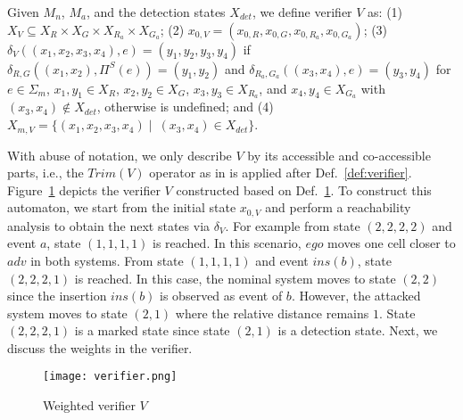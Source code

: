 \begin{definition}\label{def:verifier}
Given $M_n$, $M_a$, and the detection states $X_{det}$, we define verifier $V$ as: 
(1) $X_{V}\subseteq X_{R}\times X_G \times X_{R_a}\times X_{G_a}$; (2) $x_{0,V} = (x_{0,R},x_{0,G},x_{0,R_a},x_{0,G_a})$; (3) $\delta_{V}((x_1,x_2,x_3,x_4),e) = (y_1,y_2,y_3,y_4)$ if $\delta_{R,G}((x_1,x_2),\Pi^S(e)) = (y_1,y_2)$ and $\delta_{R_a,G_a}((x_3,x_4),e) = (y_3,y_4)$  for $e\in \Sigma_m$, $x_1,y_1\in X_R$, $x_2,y_2\in X_G$, $x_3,y_3\in X_{R_a}$, and $x_4,y_4\in X_{G_a}$ with $(x_3,x_4)\not\in X_{det}$, otherwise is undefined; and (4) $X_{m,V} = \{(x_1,x_2,x_3,x_4) \mid \ (x_3,x_4)\in X_{det}\}$.
\end{definition}

With abuse of notation, we only describe $V$ by its accessible and co-accessible parts, i.e., the $Trim(V)$ operator as in \citep{Lafortune:2021} is applied after Def.~\ref{def:verifier}.
Figure~\ref{fig:verifier} depicts the verifier $V$ constructed based on Def.~\ref{fig:verifier}.
To construct this automaton, we start from the initial state $x_{0,V}$ and perform a reachability analysis to obtain the next states via $\delta_V$.
For example from state $(2,2,2,2)$ and event $a$, state $(1,1,1,1)$ is reached.
In this scenario, $ego$ moves one cell closer to $adv$ in both systems.
From state $(1,1,1,1)$ and event $ins(b)$, state $(2,2,2,1)$ is reached.
In this case, the nominal system moves to state $(2,2)$ since the insertion $ins(b)$ is observed as event of $b$.
However, the attacked system moves to state $(2,1)$ where the relative distance remains $1$.
State $(2,2,2,1)$ is a marked state since state $(2,1)$ is a detection state.
Next, we discuss the weights in the verifier.

\begin{figure}[thpb]
\centering
\texttt{[image: verifier.png]}
\caption{Weighted verifier $V$}
\label{fig:verifier}
\end{figure}

